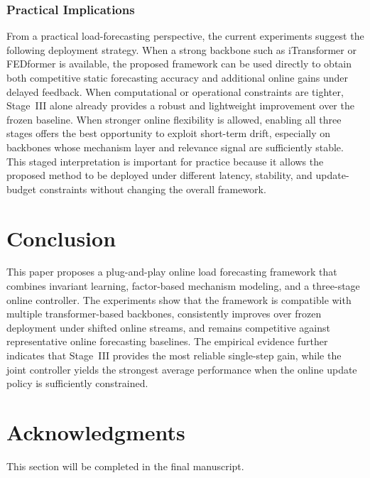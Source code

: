 ﻿\documentclass[journal]{IEEEtran}
\newenvironment{auditproblemblock}{\begingroup\color{red}}{\endgroup}
\begin{document}
\begin{auditproblemblock}
\subsubsection{Practical Implications}
From a practical load-forecasting perspective, the current experiments suggest the following deployment strategy. When a strong backbone such as iTransformer or FEDformer is available, the proposed framework can be used directly to obtain both competitive static forecasting accuracy and additional online gains under delayed feedback. When computational or operational constraints are tighter, Stage~III alone already provides a robust and lightweight improvement over the frozen baseline. When stronger online flexibility is allowed, enabling all three stages offers the best opportunity to exploit short-term drift, especially on backbones whose mechanism layer and relevance signal are sufficiently stable. This staged interpretation is important for practice because it allows the proposed method to be deployed under different latency, stability, and update-budget constraints without changing the overall framework.

\FloatBarrier
\balance
\section{Conclusion}
This paper proposes a plug-and-play online load forecasting framework that combines invariant learning, factor-based mechanism modeling, and a three-stage online controller. The experiments show that the framework is compatible with multiple transformer-based backbones, consistently improves over frozen deployment under shifted online streams, and remains competitive against representative online forecasting baselines. The empirical evidence further indicates that Stage~III provides the most reliable single-step gain, while the joint controller yields the strongest average performance when the online update policy is sufficiently constrained.

\section*{Acknowledgments}
This section will be completed in the final manuscript.
\end{auditproblemblock}
\end{document}
